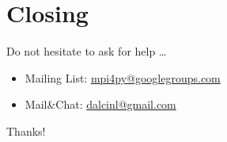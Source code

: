 \documentclass{beamer}
\newcommand{\Cpp}{C\protect\raisebox{.18ex}{++}\xspace}
\begin{document}



\section*{Closing}

\begin{frame}
  \Large
  Do not hesitate to ask for help \ldots \par
  \begin{itemize}
  \item Mailing List: \url{mpi4py@googlegroups.com}
  \item Mail\&Chat:   \url{dalcinl@gmail.com}
  \end{itemize}
  \bigskip
  \begin{centering}
   \Huge Thanks!\par
  \end{centering}
\end{frame}
\end{document}
